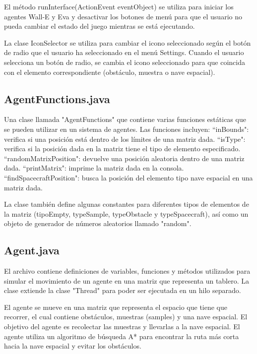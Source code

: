 \documentclass{article}
\begin{document}
El método runInterface(ActionEvent eventObject) se utiliza para iniciar los agentes Wall-E y Eva y desactivar los botones de menú para que el usuario no pueda cambiar el estado del juego mientras se está ejecutando.

La clase IconSelector se utiliza para cambiar el icono seleccionado según el botón de radio que el usuario ha seleccionado en el menú Settings. Cuando el usuario selecciona un botón de radio, se cambia el icono seleccionado para que coincida con el elemento correspondiente (obstáculo, muestra o nave espacial).

\subsection{AgentFunctions.java}
Una clase llamada "AgentFunctions" que contiene varias funciones estáticas que se pueden utilizar en un sistema de agentes. Las funciones incluyen:
    ``inBounds": verifica si una posición está dentro de los límites de una matriz dada.
    ``isType": verifica si la posición dada en la matriz tiene el tipo de elemento especificado.
    ``randomMatrixPosition": devuelve una posición aleatoria dentro de una matriz dada.
    ``printMatrix": imprime la matriz dada en la consola.
    ``findSpacecraftPosition": busca la posición del elemento tipo nave espacial en una matriz dada.

La clase también define algunas constantes para diferentes tipos de elementos de la matriz (tipoEmpty, typeSample, typeObstacle y typeSpacecraft), así como un objeto de generador de números aleatorios llamado "random".

\subsection{Agent.java}
El archivo contiene definiciones de variables, funciones y métodos utilizados para simular el movimiento de un agente en una matriz que representa un tablero. La clase extiende la clase "Thread" para poder ser ejecutada en un hilo separado.

El agente se mueve en una matriz que representa el espacio que tiene que recorrer, el cual contiene obstáculos, muestras (samples) y una nave espacial. El objetivo del agente es recolectar las muestras y llevarlas a la nave espacial. El agente utiliza un algoritmo de búsqueda A* para encontrar la ruta más corta hacia la nave espacial y evitar los obstáculos.
\end{document}
